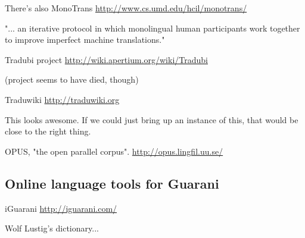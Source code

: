 There's also MonoTrans
\url{http://www.cs.umd.edu/hcil/monotrans/}

"... an iterative protocol in which monolingual human participants work
together to improve imperfect machine translations." 

Tradubi project
\url{http://wiki.apertium.org/wiki/Tradubi}

(project seems to have died, though)

Traduwiki
\url{http://traduwiki.org}

This looks awesome. If we could just bring up an instance of this, that would
be close to the right thing.

OPUS, "the open parallel corpus".
\url{http://opus.lingfil.uu.se/}

\subsection{Online language tools for Guarani}

iGuarani
\url{http://iguarani.com/}

Wolf Lustig's dictionary...

